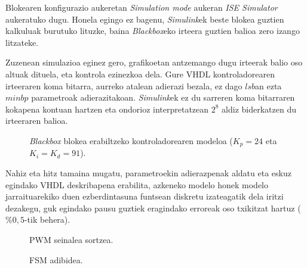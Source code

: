 Blokearen konfigurazio aukeretan \emph{Simulation mode} aukeran \emph{ISE Simulator} aukeratuko dugu. Honela egingo ez bagenu, \emph{Simulink}ek beste blokea guztien kalkuluak burutuko lituzke, baina \emph{Blackbox}eko irteera guztien balioa zero izango litzateke.

Zuzenean simulazioa eginez gero, grafikoetan antzemango dugu irteerak balio oso altuak dituela, eta kontrola ezinezkoa dela. Gure VHDL kontroladorearen irteeraren koma bitarra, aurreko atalean adierazi bezala, ez dago $lsb$an ezta $minbp$ parametroak adierazitakoan. \emph{Simulink}ek ez du sarreren koma bitarraren kokapena kontuan hartzen eta ondorioz interpretatzean $2^8$ aldiz biderkatzen du irteeraren balioa.

\begin{figure}[!htp]
\centering

\caption[Modeloa: \emph{Blackbox} (kontroladorea)]{\emph{Blackbox} blokea erabiltzeko kontroladorearen modeloa ($K_p=24$ eta $K_i=K_d=91$).}
\label{fig:mod_box}
\end{figure}

Nahiz eta hitz tamaina mugatu, parametroekin adierazpenak aldatu eta eskuz egindako VHDL deskribapena erabilita, azkeneko modelo honek modelo jarraituarekiko duen ezberdintasuna funtsean diskretu izateagatik dela iritzi dezakegu, guk egindako pausu guztiek eragindako erroreak oso txikitzat hartuz ($\%0,5$-tik behera).

\begin{figure}[!htp]
\centering

\caption{PWM seinalea sortzea.}
\label{fig:pwm}
\end{figure}

\begin{figure}[!htp]
\centering

\caption{FSM adibidea.}
\label{fig:hbridge}
\end{figure}